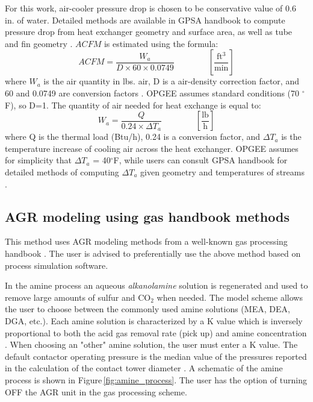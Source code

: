 \documentclass[11pt]{report}
\newcommand{\eqnunitfrac}[2]{\quad\quad \scriptstyle{\left[\frac{\text{#1}}{\text{#2}}\right]}}
\begin{document}
For this work, air-cooler pressure drop is chosen to be conservative value of 0.6 in. of water. Detailed methods are available in GPSA handbook to compute pressure drop from heat exchanger geometry and surface area, as well as tube and fin geometry \cite[Ch. 10]{GPSA2004}. $ACFM$ is estimated using the formula:
\begin{equation}
ACFM = \frac{W_a}{D \times 60 \times 0.0749} \quad\quad\eqnunitfrac{ft$^3$}{min}
\end{equation}
where $W_a$ is the air quantity in lbs. air, D is a air-density correction factor, and 60 and 0.0749 are conversion factors \cite[p. 10-16]{GPSA2004}.  OPGEE assumes standard conditions (70 $^\circ$F), so D=1. The quantity of air needed for heat exchange is equal to:
\begin{equation}
W_a = \frac{Q}{0.24 \times \Delta T_a} \quad\quad\eqnunitfrac{lb}{h}
\end{equation}
where Q is the thermal load (Btu/h), 0.24 is a conversion factor, and $\Delta T_a$ is the temperature increase of cooling air across the heat exchanger. OPGEE assumes for simplicity that $\Delta T_a$ = 40$^\circ$F, while users can consult GPSA handbook for detailed methods of computing $\Delta T_a$ given geometry and temperatures of streams \cite[Ch. 10]{GPSA2004}.

\subsection{AGR modeling using gas handbook methods}

This method uses AGR modeling methods from a well-known gas processing handbook \cite{Manning1991}. The user is advised to preferentially use the above method based on process simulation software.

In the amine process an aqueous \textit{alkanolamine} solution is regenerated and used to remove large amounts of sulfur and CO$_{2}$ when needed. The model scheme allows the user to choose between the commonly used amine solutions (MEA, DEA, DGA, etc.). Each amine solution is characterized by a K value which is inversely proportional to both the acid gas removal rate (pick up) and amine concentration \cite[p. 115]{Manning1991}. When choosing an "other" amine solution, the user must enter a K value. The default contactor operating pressure is the median value of the pressures reported in the calculation of the contact tower diameter \cite{Khan1985} \cite[p. 117]{Manning1991}. A schematic of the amine process is shown in Figure\,\ref{fig:amine_process}. The user has the option of turning OFF the AGR unit in the gas processing scheme.  
\end{document}

